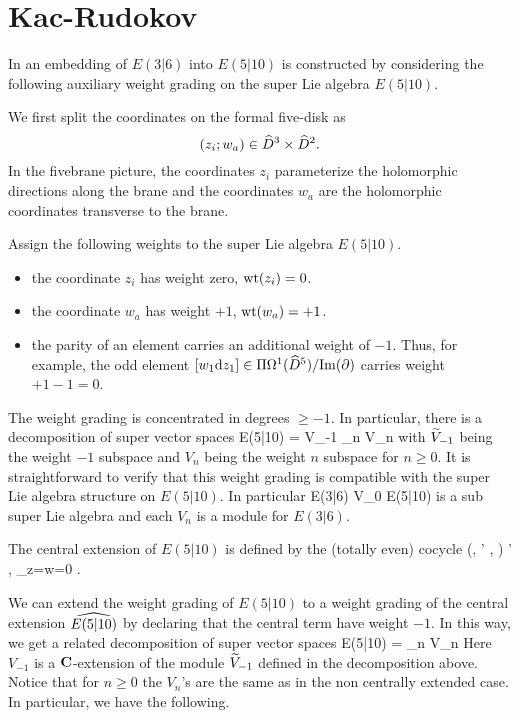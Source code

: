 \documentclass[11pt]{amsart}
\begin{document}
\section{Kac-Rudokov}

In \cite{KacRudakov} an embedding of $E(3|6)$ into $E(5|10)$ is constructed by considering the following auxiliary weight grading on the super Lie algebra $E(5|10)$. 

We first split the coordinates on the formal five-disk as
\[
(z_i ; w_a) \in \Hat{D}^3 \times \Hat{D}^2 .
\]
In the fivebrane picture, the coordinates $z_i$ parameterize the holomorphic directions along the brane and the coordinates $w_a$ are the holomorphic coordinates transverse to the brane.

Assign the following weights to the super Lie algebra $E(5|10)$. 
\begin{itemize} 
\item the coordinate $z_i$ has weight zero, $\wt(z_i) = 0$. 
\item the coordinate $w_a$ has weight $+1$, $\wt(w_a) = +1$. 
\item the parity of an element carries an additional weight of $-1$. 
Thus, for example, the odd element $[w_1 \d z_1] \in \Pi \Omega^1(\Hat{D}^5)/{\rm Im}(\del)$ carries weight $+1 - 1 = 0$. 
\end{itemize} 
The weight grading is concentrated in degrees $\geq -1$. 
In particular, there is a decomposition of super vector spaces
\beqn\label{eqn:decomp1}
E(5|10) = \til V_{-1} \times \prod_{n } V_n 
\eeqn
with $\til V_{-1}$ being the weight $-1$ subspace and $V_n$ being the weight $n$ subspace for $n \geq 0$.  
It is straightforward to verify that this weight grading is compatible with the super Lie algebra structure on $E(5|10)$. 
In particular 
\beqn 
\label{eqn:e36iso}
E(3|6) \cong V_0 \subset E(5|10)
\eeqn
is a sub super Lie algebra and each $V_n$ is a module for $E(3|6)$. 

\parsec[s:e510central]

The central extension of $E(5|10)$ is defined by the (totally even) cocycle
\beqn\label{eqn:e510central}
(\mu, \mu' , \alpha) \mapsto \<\mu \wedge \mu' , \alpha\>_{z=w=0} .
\eeqn

We can extend the weight grading of $E(5|10)$ to a weight grading of the central extension $\Hat{E(5|10)}$ by declaring that the central term have weight $-1$.
In this way, we get a related decomposition of super vector spaces
\beqn\label{eqn:decomp1}
E(5|10) = \prod_{n } V_n
\eeqn
Here $V_{-1}$ is a $\C$-extension of the module $\til V_{-1}$ defined in the decomposition above.
Notice that for $n \geq 0$ the $V_n$'s are the same as in the non centrally extended case.
In particular, we have the following. 
\end{document}
